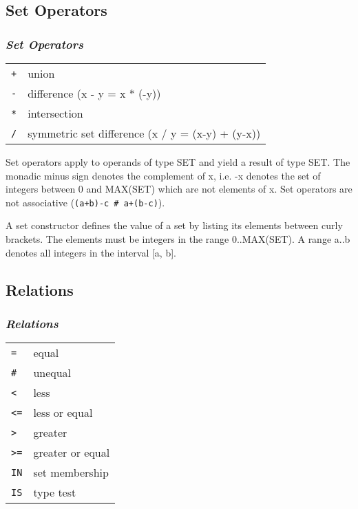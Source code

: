 \ifonline
\subsection{Set Operators}
\else
\subsubsection{\em Set Operators}
\fi

\begin{tabular}{ll}
        \verb|+| &  union                                            \\
        \verb|-| &  difference  (x - y = x * (-y))                   \\
        \verb|*| &  intersection                                     \\
        \verb|/| &  symmetric set difference (x / y = (x-y) + (y-x)) \\
\end{tabular}

\noindent
Set operators apply to operands of type SET and yield a result of
type SET. The monadic minus sign denotes the complement of x, i.e.
-x denotes the set of integers between 0 and MAX(SET) which are not
elements of x. Set operators are not associative (\verb|(a+b)-c # a+(b-c)|).

A set constructor defines the value of a set by listing its elements
between curly brackets. The elements must be integers in the range
0..MAX(SET). A range a..b denotes all integers in the interval [a,
b].

\ifonline
\subsection{Relations}
\else
\subsubsection{\em Relations}
\fi

\begin{tabular}{ll}
        \verb|=| &  equal               \\
        \verb|#| &  unequal             \\
        \verb|<| &  less                \\
        \verb|<=|&  less or equal       \\
        \verb|>| &  greater             \\
        \verb|>=|&  greater or equal    \\
        \verb|IN|&  set membership      \\
        \verb|IS|&  type test           \\
\end{tabular}

